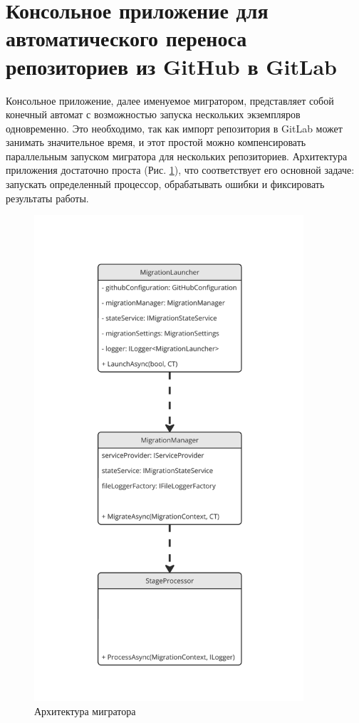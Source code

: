 \section{Консольное приложение для автоматического переноса репозиториев из GitHub в GitLab} \label{sec:gitlab-migrator-app}
Консольное приложение, далее именуемое мигратором, представляет собой конечный автомат\cite{fsm} с возможностью запуска нескольких экземпляров одновременно.
Это необходимо, так как импорт репозитория в GitLab может занимать значительное время, и этот простой можно компенсировать параллельным запуском мигратора для нескольких репозиториев.
Архитектура приложения достаточно проста (Рис. \ref{fig:gitlab-migrator-app-architecture}), что соответствует его основной задаче: запускать определенный процессор, обрабатывать ошибки и фиксировать результаты работы.

\begin{figure}[H]
  \centering
  \includegraphics[width=10cm]{img/gitlab-migrator-app-architecture}
  \caption{Архитектура мигратора}
  \label{fig:gitlab-migrator-app-architecture}
\end{figure}

